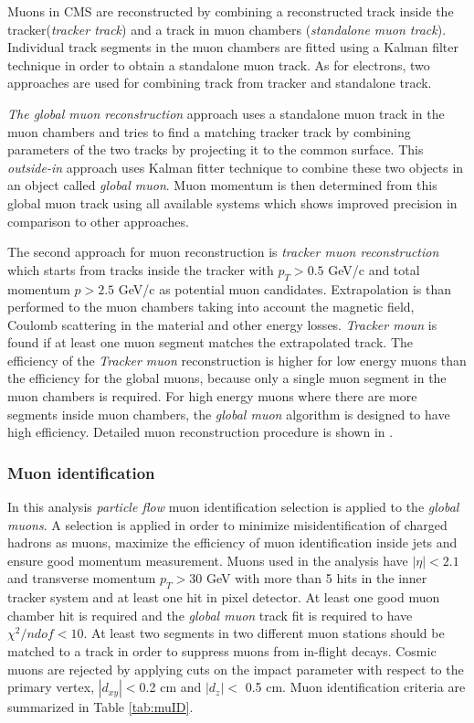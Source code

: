Muons in CMS are reconstructed by combining a reconstructed track inside the tracker(\textit{tracker track}) and a track in muon chambers (\textit{standalone muon track}). Individual track segments in the muon chambers are fitted using a Kalman filter technique \cite{Fruhwirth1987444}  in order to obtain a standalone muon track. As for electrons, two approaches are used for combining track from tracker and standalone track. 
\par \textit{The global muon reconstruction} approach uses a standalone muon track in the muon chambers and tries to find a matching tracker track by combining parameters of the two tracks by projecting it to the common surface. This \textit{outside-in} approach uses Kalman fitter technique to combine these two objects in an object called \textit{global muon}. Muon momentum is then determined from this global muon track using all available systems which shows improved precision in comparison to other approaches.  
\par The second approach for muon reconstruction is \textit{tracker muon reconstruction} which starts from tracks inside the tracker with $p_T>0.5$ GeV/c and total momentum $p>2.5$ GeV/c as potential muon candidates. Extrapolation is than performed to the muon chambers taking into account the magnetic field, Coulomb scattering in the material and other energy losses. \textit{Tracker moun} is found if at least one muon segment matches the extrapolated track. The efficiency of the \textit{Tracker muon} reconstruction is higher for low energy muons than the efficiency for the global muons, because only a single muon segment in the muon chambers is required. For high energy muons where there are more segments inside muon chambers, the \textit{global muon} algorithm is designed to have high efficiency. Detailed muon reconstruction procedure is shown in \cite{2012JInst7P0002T}.    


\subsubsection*{Muon identification}
\label{sec:muID}

In this analysis \textit{particle flow} muon identification selection is applied to the \textit{global muons}. A selection is applied in order to minimize misidentification of charged hadrons as muons, maximize the efficiency of muon identification inside jets and ensure good momentum measurement. Muons used in the analysis have $|\eta|<2.1$ and transverse momentum $p_T>30$ GeV with more than 5 hits in the inner tracker system and at least one hit in pixel detector. At least one good muon chamber hit is required and the \textit{global muon} track fit is required to have $\chi^2/ndof<10$. At least two segments in two different muon stations should be matched to a track in order to suppress muons from in-flight decays. Cosmic muons are rejected by applying cuts on the impact parameter with respect to the primary vertex, $|d_{xy}|<$0.2 cm and $|d_z|<$ 0.5 cm. Muon identification criteria are summarized in Table \ref{tab:muID}.

